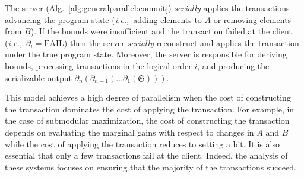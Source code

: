\documentclass{article} %
\newcommand{\ie}{{\em i.e.,}~}
\newcommand{\Comments}{1}
\newcommand{\note}[2]{\ifnum\Comments=1\textcolor{#1}{#2}\fi}
\newcommand{\xinghao}[1]{\note{red}{[XP: #1]}}
\newcommand{\algref}[1]{Alg.~\ref{#1}}
\begin{document}

The server (\algref{alg:generalparallel:commit}) \emph{serially} applies the transactions advancing the program state (\ie adding elements to $A$ or removing elements from $B$).
If the bounds were insufficient and the transaction failed at the client (\ie $\partial_i = \text{FAIL}$) then the server \emph{serially} reconstruct and applies the transaction under the true program state.
Moreover, the server is responsible for deriving bounds, processing transactions in the logical order $i$, and producing the serializable output $\partial_n (\partial_{n-1}(\ldots \partial_1(\mathfrak{S})))$.





This model achieves a high degree of parallelism when the cost of constructing the transaction dominates the cost of applying the transaction.
For example, in the case of submodular maximization, the cost of constructing the transaction depends on evaluating the marginal gains with respect to changes in $A$ and $B$ while the cost of applying the transaction reduces to setting a bit.
It is also essential that only a few transactions fail at the client.
Indeed, the analysis of these systems focuses on ensuring that the majority of the transactions succeed.
\end{document}
